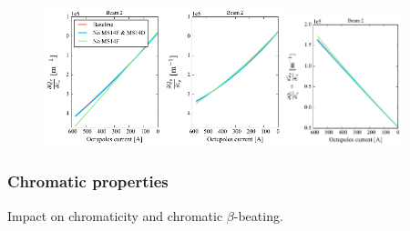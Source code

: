 \documentclass{cernatsnote}
\begin{document}
\begin{figure}[h!]
\includegraphics[width=0.31\textwidth]{images/qxjx_all_b2_ca.pdf}\hfill \includegraphics[width=0.31\textwidth]{images/qyjy_all_b2_ca.pdf}\hfill \includegraphics[width=0.31\textwidth]{images/qxjy_all_b2_ca.pdf} \\
\caption{\label{amp_det_all} }
\end{figure}


\subsubsection{Chromatic properties}

Impact on chromaticity and chromatic $\beta$-beating.
\end{document}
